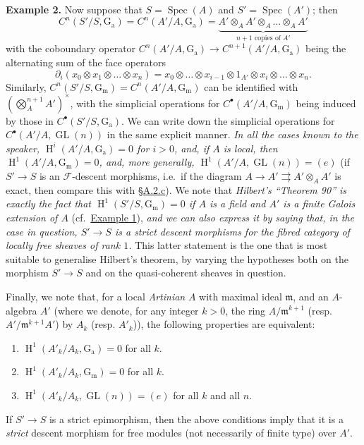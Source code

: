 \documentclass{article}
\providecommand{\tightlist}{%
  \setlength{\itemsep}{0pt}\setlength{\parskip}{0pt}}
\newenvironment{rmenv}[1]
  {\phantomsection\par\smallskip\noindent\textbf{#1.}\rmfamily}
  {\par\smallskip}
\newcommand{\oldpage}[1]{\marginpar{\footnotesize$\Big\vert$ \textit{p.~#1}}}
\theoremstyle{definition}
\theoremstyle{definition}
\theoremstyle{definition}
\theoremstyle{definition}
\theoremstyle{remark}
\begin{document}
\begin{rmenv}{Example 2}
Now suppose that \(S=\operatorname{Spec}(A)\) and \(S'=\operatorname{Spec}(A')\);
then
\[
  C^n(S'/S,\operatorname{G_a})
  = C^n(A'/A,\operatorname{G_a})
  = \underbrace{A'\otimes_A A'\otimes_A\ldots\otimes_A A'}_{n+1\text{ copies of }A'}
\]
with the coboundary operator \(C^n(A'/A,\operatorname{G_a})\to C^{n+1}(A'/A,\operatorname{G_a})\) being the alternating sum of the face operators
\[
  \partial_i(x_0\otimes x_1\otimes\ldots\otimes x_n)
  = x_0\otimes\ldots\otimes x_{i-1}\otimes1_{A'}\otimes x_i\otimes\ldots\otimes x_n.
\]
Similarly, \(C^n(S'/S,\operatorname{G_m})=C^n(A'/A,\operatorname{G_m})\) can be identified with \((\bigotimes_A^{n+1}A')^\times\), with the simplicial operations for \(C^\bullet(A'/A,\operatorname{G_m})\) being induced by those in \(C^\bullet(S'/S,\operatorname{G_a})\).
We can write down the simplicial operations for \(C^\bullet(A'/A,\operatorname{GL}(n))\) in the same explicit manner.
\emph{In all the cases known to the speaker, \(\operatorname{H}^i(A'/A,\operatorname{G_a})=0\) for \(i>0\), and, if \(A\) is local, then \(\operatorname{H}^1(A'/A,\operatorname{G_m})=0\), and, more generally, \(\operatorname{H}^1(A'/A,\operatorname{GL}(n))=(e)\)} (if \(S'\to S\) is an \({\mathcal{F}}\)-descent morphisms, i.e.~if the diagram \(A\to A'\rightrightarrows A'\otimes_A A'\) is exact, then compare this with \protect\hyperlink{fga-3-i-section-A.2.c}{§A.2.c}).
\oldpage{190-16}We note that \emph{Hilbert's ``Theorem 90'' is exactly the fact that \(\operatorname{H}^1(S'/S,\operatorname{G_m})=0\) if \(A\) is a field and \(A'\) is a finite Galois extension of \(A\)} (cf.~\protect\hyperlink{fga-3-i-section-A.4-example-1}{Example 1}), \emph{and we can also express it by saying that, in the case in question, \(S'\to S\) is a strict descent morphisms for the fibred category of locally free sheaves of rank \(1\).}
This latter statement is the one that is most suitable to generalise Hilbert's theorem, by varying the hypotheses both on the morphism \(S'\to S\) and on the quasi-coherent sheaves in question.

Finally, we note that, for a local \emph{Artinian} \(A\) with maximal ideal \({\mathfrak{m}}\), and an \(A\)-algebra \(A'\) (where we denote, for any integer \(k>0\), the ring \(A/{\mathfrak{m}}^{k+1}\) (resp. \(A'/{\mathfrak{m}}^{k+1}A'\)) by \(A_k\) (resp. \(A'_k\))), the following properties are equivalent:

\begin{enumerate}
\def\labelenumi{\roman{enumi}.}
\tightlist
\item
  \(\operatorname{H}^1(A'_k/A_k,\operatorname{G_a})=0\) for all \(k\).
\item
  \(\operatorname{H}^1(A'_k/A_k,\operatorname{G_m})=0\) for all \(k\).
\item
  \(\operatorname{H}^1(A'_k/A_k,\operatorname{GL}(n))=(e)\) for all \(k\) and all \(n\).
\end{enumerate}

If \(S'\to S\) is a strict epimorphism, then the above conditions imply that it is a \emph{strict} descent morphism for free modules (not necessarily of finite type) over \(A'\).

\end{rmenv}
\end{document}
